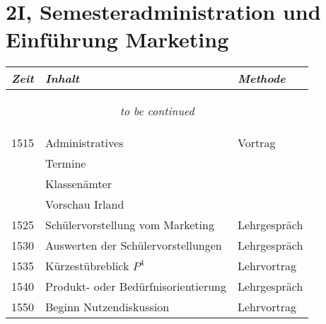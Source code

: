 \documentclass[a4paper]{scrreprt}
\begin{document}
\section*{2I, Semesteradministration und Einführung Marketing}
\begin{longtable}{p{1.5cm}>{\RaggedRight}p{7.5cm}p{2.5cm}}
    \toprule
    \emph{Zeit}&\emph{Inhalt}&\emph{Methode}\\
    \midrule
    \endhead

    \midrule
    \multicolumn{3}{c}{\begin{tiny}\textit{to be continued}\end{tiny}}\\
    \midrule
    \endfoot

    \bottomrule
    \endlastfoot

    1515&Administratives&Vortrag\\ [5pt]
        &Termine&\\
        &Klassenämter&\\
        &Vorschau Irland&\\

    1525&Schülervorstellung vom Marketing&Lehrgespräch\\ [5pt]

    1530&Auswerten der Schülervorstellungen&Lehrgespräch\\ [5pt]

    1535&Kürzestübreblick $P^4$&Lehrvortrag\\ [5pt]

    1540&Produkt- oder Bedürfnisorientierung&Lehrgespräch\\ [5pt]

    1550&Beginn Nutzendiskussion&Lehrvortrag\\

\end{longtable}
\end{document}
